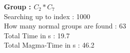 \textbf{Group : $C_2*C_7$}\\
Searching up to index : 1000\\
How many normal groups are found : 63\\
Total Time in s : 19.7\\
Total Magma-Time in s : 46.2\\
